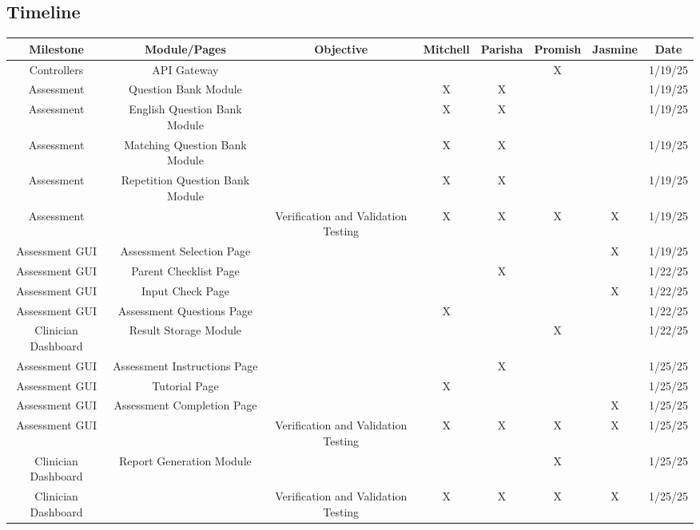 \documentclass[12pt, titlepage]{article}
\begin{document}
\newpage
\begin{landscape}
\section{Timeline}
\scriptsize
\begin{longtable}{|c|c|c|c|c|c|c|c|}
  \hline
      \textbf{Milestone} & \textbf{Module/Pages} & \textbf{Objective} & \textbf{Mitchell} & \textbf{Parisha} & \textbf{Promish} & \textbf{Jasmine} & \textbf{Date} \\ \hline
      Controllers & API Gateway & ~ & ~ & ~ & X & ~ & 1/19/25 \\ \hline
      Assessment & Question Bank Module & ~ & X & X & ~ & ~ & 1/19/25 \\ \hline
      Assessment & English Question Bank  Module & ~ & X & X & ~ & ~ & 1/19/25 \\ \hline
      Assessment & Matching Question Bank  Module & ~ & X & X & ~ & ~ & 1/19/25 \\ \hline
      Assessment & Repetition Question Bank  Module & ~ & X & X & ~ & ~ & 1/19/25 \\ \hline
      Assessment & ~ & Verification and Validation Testing & X & X & X & X & 1/19/25 \\ \hline
      Assessment GUI & Assessment Selection Page & ~ & ~ & ~ & ~ & X & 1/19/25 \\ \hline
      Assessment GUI & Parent Checklist Page & ~ & ~ & X & ~ & ~ & 1/22/25 \\ \hline
      Assessment GUI & Input Check Page & ~ & ~ & ~ & ~ & X & 1/22/25 \\ \hline
      Assessment GUI & Assessment Questions Page & ~ & X & ~ & ~ & ~ & 1/22/25 \\ \hline
      Clinician Dashboard & Result Storage Module & ~ & ~ & ~ & X & ~ & 1/22/25 \\ \hline
      Assessment GUI & Assessment Instructions Page & ~ & ~ & X & ~ & ~ & 1/25/25 \\ \hline
      Assessment GUI & Tutorial Page & ~ & X & ~ & ~ & ~ & 1/25/25 \\ \hline
      Assessment GUI & Assessment Completion Page & ~ & ~ & ~ & ~ & X & 1/25/25 \\ \hline
      Assessment GUI & ~ & Verification and Validation Testing & X & X & X & X & 1/25/25 \\ \hline
      Clinician Dashboard & Report Generation Module & ~ & ~ & ~ & X & ~ & 1/25/25 \\ \hline
      Clinician Dashboard & ~ & Verification and Validation Testing & X & X & X & X & 1/25/25 \\ \hline

\end{longtable}
\end{landscape}
\end{document}
